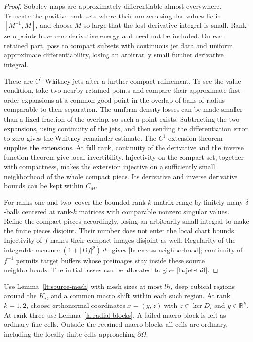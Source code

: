 \documentclass[11pt]{article}
\numberwithin{equation}{section}
\theoremstyle{definition}
\theoremstyle{remark}
\begin{document}
\begin{proof}
Sobolev maps are approximately differentiable almost everywhere.
Truncate the positive-rank sets where their nonzero singular values
lie in $[M^{-1},M]$, and choose $M$ so large that the lost derivative
integral is small.  Rank-zero points have zero derivative energy and
need not be included.  On each retained part, pass to compact subsets
with continuous jet data and uniform approximate differentiability,
losing an arbitrarily small further derivative integral.

These are $C^1$ Whitney jets after a further compact refinement.  To
see the value condition, take two nearby retained points and compare
their approximate first-order expansions at a common good point in
the overlap of balls of radius comparable to their separation.  The
uniform density losses can be made smaller than a fixed fraction of
the overlap, so such a point exists.  Subtracting the two expansions,
using continuity of the jets, and then sending the differentiation
error to zero gives the Whitney remainder estimate.  The $C^1$
extension theorem~\cite[Part~I, Section~4, Theorem~I]{Whitney1934} supplies the extensions.  At full rank, continuity
of the derivative and the inverse function theorem give local
invertibility.  Injectivity on the compact set, together with
compactness, makes the extension injective on a sufficiently small
neighborhood of the whole compact piece.  Its derivative and inverse
derivative bounds can be kept within $C_M$.

For ranks one and two, cover the bounded rank-$k$ matrix range by
finitely many $\delta$-balls centered at rank-$k$ matrices with
comparable nonzero singular values.  Refine the compact pieces
accordingly, losing an arbitrarily small integral to make the finite
pieces disjoint.  Their number does not enter the local chart
bounds.  Injectivity of $f$ makes their compact images disjoint as
well.  Regularity of the integrable measure $(1+|Df|^p)\,dx$ gives
\eqref{la:excess-neighborhood}; continuity of $f^{-1}$ permits target
buffers whose preimages stay inside these source neighborhoods.
The initial losses can be allocated to give
\eqref{la:jet-tail}.
\end{proof}

Use Lemma~\ref{lt:source-mesh} with mesh sizes at most $lh$, deep
cubical regions around the $K_i$, and a common macro shift within
each such region.  At rank $k=1,2$, choose orthonormal coordinates
$x=(y,z)$ with $z\in\ker D_i$ and $y\in\mathbb R^k$.  At rank three use
Lemma~\ref{la:radial-blocks}.  A failed macro block is left as ordinary
fine cells.  Outside the retained macro blocks all cells are ordinary,
including the locally finite cells approaching $\partial\Omega$.
\end{document}
